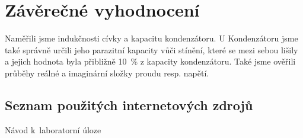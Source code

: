 \documentclass[a4paper,12pt]{article}   %
\begin{document}
\section{Závěrečné vyhodnocení}
\label{chap:zaver}
Naměřili jsme indukčnosti cívky a kapacitu kondenzátoru. U Kondenzátoru jsme také správně určili jeho parazitní kapacity vůči stínění, které se mezi sebou lišily a jejich hodnota byla přibližně 10~\% z kapacity kondenzátoru. Také jsme ověřili průběhy reálné a imaginární složky proudu resp. napětí.


\clearpage
\renewcommand{\refname}{Seznam použité literatury a~zdrojů informací} 

\begin{thebibliography}{99}

\subsection*{Seznam použitých internetových zdrojů}
     Návod k~laboratorní úloze
    
\end{thebibliography}
\end{document}
